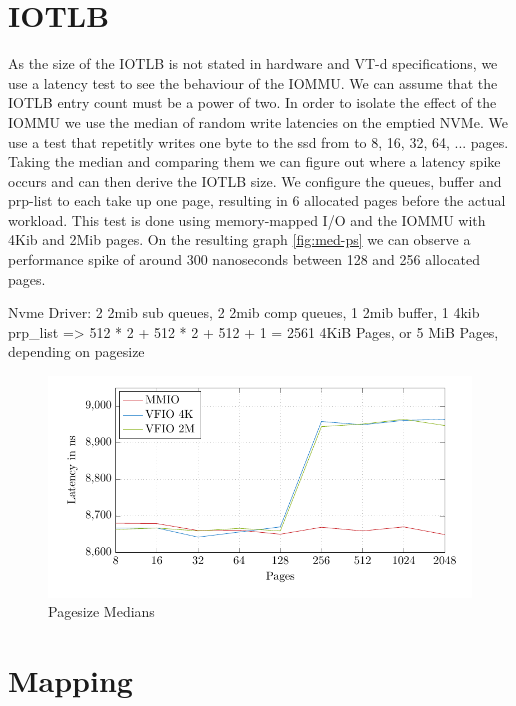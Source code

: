 \section{IOTLB}
As the size of the IOTLB is not stated in hardware and VT-d specifications, we use a latency test to see the behaviour of the IOMMU. We can assume that the IOTLB entry count must be a power of two. In order to isolate the effect of the IOMMU we use the median of random write latencies on the emptied NVMe. We use a test that repetitly writes one byte to the ssd from to 8, 16, 32, 64, ... pages. Taking the median and comparing them we can figure out where a latency spike occurs and can then derive the IOTLB size. We configure the queues, buffer and prp-list to each take up one page, resulting in 6 allocated pages before the actual workload. This test is done using memory-mapped I/O and the IOMMU with 4Kib and 2Mib pages.
On the resulting graph \autoref{fig:med-ps} we can observe a performance spike of around 300 nanoseconds between 128 and 256 allocated pages.

Nvme Driver: 2 2mib sub queues, 2 2mib comp queues, 1 2mib buffer, 1 4kib prp\_list => 512 * 2 + 512 * 2 + 512 + 1 = 2561 4KiB Pages, or 5 MiB Pages, depending on pagesize

\begin{figure}
    \centering
    \includegraphics[width=\textwidth]{figures/latency_ps_medians}
    \caption{Pagesize Medians}
    \label{fig:med-ps}
\end{figure}

\section{Mapping}
